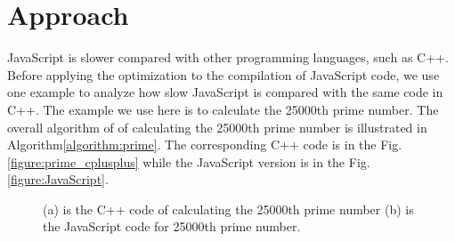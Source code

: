 \documentclass[conference]{IEEEtran}
\begin{document}
\section{Approach}
JavaScript is slower compared with other programming languages, such as C++. Before applying the optimization to the compilation of JavaScript code, we use one example to analyze how slow JavaScript is compared with the same code in C++. The example we use here is to calculate the 25000th prime number\cite{google_IO}. The overall algorithm of of calculating the 25000th prime number is illustrated in Algorithm\ref{algorithm:prime}.
The corresponding C++ code is in the Fig.\ref{figure:prime_cplusplus} while the JavaScript version is in the Fig.\ref{figure:JavaScript}.

\begin{figure}[hbt!]
	\label{figure:prime}
    \centering
    \caption{(a) is the C++ code of calculating the 25000th prime number (b) is the JavaScript code for 25000th prime number.}
 \end{figure}
%
%
%
%
%
%
\end{document}
